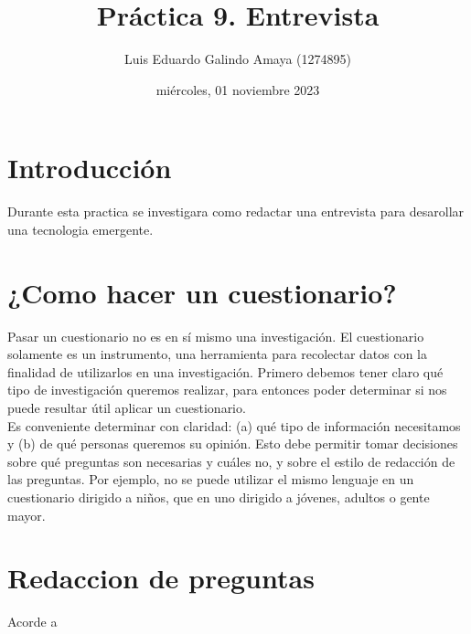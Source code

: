 \documentclass[11pt]{article}
\author{Luis Eduardo Galindo Amaya (1274895)}
\date{miércoles, 01 noviembre 2023}
\title{Práctica 9. Entrevista}
\begin{document}
\makeatletter
\makeatletter
{}
\tableofcontents
\pagebreak
{}

\section{Introducción}
\label{sec:org8ec7836}
Durante esta practica se investigara como redactar una entrevista para
desarollar una tecnologia emergente.

\section{¿Como hacer un cuestionario?}
\label{sec:orgc39c6af}
\autocite{olmo2002cuestionario} Pasar un cuestionario no es en sí
mismo una investigación. El cuestionario solamente es un instrumento,
una herramienta para recolectar datos con la finalidad de utilizarlos
en una investigación. Primero debemos tener claro qué tipo de
investigación queremos realizar, para entonces poder determinar si nos
puede resultar útil aplicar un cuestionario. \\

\autocite{olmo2002cuestionario} Es conveniente determinar con
claridad: (a) qué tipo de información necesitamos y (b) de qué
personas queremos su opinión. Esto debe permitir tomar decisiones
sobre qué preguntas son necesarias y cuáles  no, y sobre el estilo de
redacción de las preguntas. Por ejemplo, no  se puede utilizar el
mismo lenguaje en un cuestionario dirigido a niños, que en uno
dirigido a jóvenes, adultos o gente mayor.

\section{Redaccion de preguntas}
\label{sec:org4489a94}
Acorde a \cite{Fernandez_2007}
\end{document}

